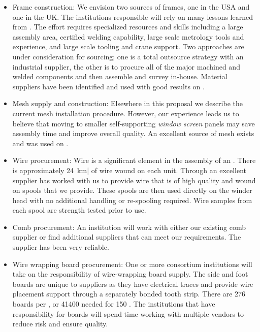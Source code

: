 \begin{itemize}

\item Frame construction: We envision two sources of frames, one in the USA and one in the UK. The institutions responsible will rely on many lessons learned from . The effort requires specialized resources and skills including a large assembly area, certified welding capability, large scale metrology tools and experience, and large scale tooling and crane support. Two approaches are under consideration for sourcing; one is a total outsource strategy with an industrial supplier, the other is to procure all of the major machined and welded components and then assemble and survey in-house. Material suppliers have been identified and used with good results on .

\item Mesh supply and construction: Elsewhere in this proposal we describe the current mesh installation procedure. However, our  experience leads us to believe that moving to smaller self-supporting \textit{window screen} panels may save assembly time and improve overall  quality. An excellent source of mesh exists and was used on .

\item Wire procurement: Wire is a significant element in the assembly of an . There is approximately \SI{24}{km}| of wire wound on each unit. Through  %
an excellent supplier %
has worked with us to provide wire that is of high quality and wound on spools that we provide. These spools are then used directly on the winder head with no additional handling or re-spooling required. Wire samples from each spool are strength tested prior to use.

\item Comb procurement: An institution will work with either our existing comb supplier or find additional suppliers that can meet our requirements. The  supplier has been very reliable.

\item Wire wrapping board procurement: One or more consortium institutions will take on the responsibility of wire-wrapping board supply. The side and foot boards are unique to suppliers as they have electrical traces and provide wire placement support through a separately bonded tooth strip. There are \num{276} boards per , or \num{41400} needed for \num{150} . The institutions that have responsibility for boards will spend time working with multiple vendors to reduce risk and ensure quality. 


\end{itemize}
